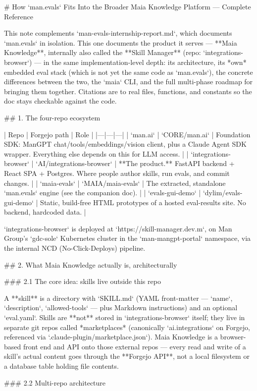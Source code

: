 # How `man.evals` Fits Into the Broader Maia Knowledge Platform — Complete Reference

This note complements `man-evals-internship-report.md`, which documents `man.evals` in isolation.
This one documents the product it serves — **Maia Knowledge**, internally also called the **Skill Manager** (repo: `integrations-browser`) — in the same implementation-level depth: its architecture, its *own* embedded eval stack (which is not yet the same code as `man.evals`), the concrete differences between the two, the `maia` CLI, and the full multi-phase roadmap for bringing them together. Citations are to real files, functions, and constants so the doc stays checkable against the code.

## 1. The four-repo ecosystem

| Repo | Forgejo path | Role |
|---|---|---|
| `man.ai` | `CORE/man.ai` | Foundation SDK: ManGPT chat/tools/embeddings/vision client, plus a Claude Agent SDK wrapper. Everything else depends on this for LLM access. |
| `integrations-browser` | `AI/integrations-browser` | **The product.** FastAPI backend + React SPA + Postgres. Where people author skills, run evals, and commit changes. |
| `maia-evals` | `MAIA/maia-evals` | The extracted, standalone `man.evals` engine (see the companion doc). |
| `evals-gui-demo` | `dylim/evals-gui-demo` | Static, build-free HTML prototypes of a hosted eval-results site. No backend, hardcoded data. |

`integrations-browser` is deployed at `https://skill-manager.dev.m`, on Man Group's `gdc-sole` Kubernetes cluster in the `man-mangpt-portal` namespace, via the internal NCD (No-Click-Deploys) pipeline.

## 2. What Maia Knowledge actually is, architecturally

### 2.1 The core idea: skills live outside this repo

A **skill** is a directory with `SKILL.md` (YAML front-matter — `name`, `description`, `allowed-tools` — plus Markdown instructions) and an optional `eval.yaml`. Skills are **not** stored in `integrations-browser` itself; they live in separate git repos called *marketplaces* (canonically `ai.integrations` on Forgejo, referenced via `.claude-plugin/marketplace.json`). Maia Knowledge is a browser-based front end and API onto those external repos — every read and write of a skill's actual content goes through the **Forgejo API**, not a local filesystem or a database table holding file contents.

### 2.2 Multi-repo architecture

